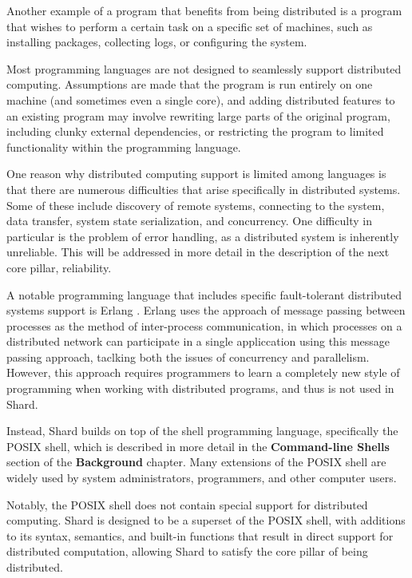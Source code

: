 \documentclass[twoside]{report}
\newcommand{\todoi}[1]{\todo[inline, color=blue!20]{TODO: {#1}}}
\begin{document}
Another example of a program that benefits from being distributed is a program that wishes to perform a certain task on a specific set of machines, such as installing packages, collecting logs, or configuring the system.

Most programming languages are not designed to seamlessly support distributed computing.
Assumptions are made that the program is run entirely on one machine (and sometimes even a single core), and adding distributed features to an existing program may involve rewriting large parts of the original program, including clunky external dependencies, or restricting the program to limited functionality within the programming language.

One reason why distributed computing support is limited among languages is that there are numerous difficulties that arise specifically in distributed systems. Some of these include discovery of remote systems, connecting to the system, data transfer, system state serialization, and concurrency.
One difficulty in particular is the problem of error handling, as a distributed system is inherently unreliable. This will be addressed in more detail in the description of the next core pillar, reliability.

A notable programming language that includes specific fault-tolerant distributed systems support is Erlang \cite{armstrong2010erlang}. Erlang uses the approach of message passing between processes as the method of inter-process communication, in which processes on a distributed network can participate in a single appliccation using this message passing approach, taclking both the issues of concurrency and parallelism.
However, this approach requires programmers to learn a completely new style of programming when working with distributed programs, and thus is not used in Shard.


Instead, Shard builds on top of the shell programming language, specifically the POSIX shell, which is described in more detail in the \textbf{Command-line Shells} section of the \textbf{Background} chapter. Many extensions of the POSIX shell are widely used by system administrators, programmers, and other computer users.

Notably, the POSIX shell does not contain special support for distributed computing. Shard is designed to be a superset of the POSIX shell, with additions to its syntax, semantics, and built-in functions that result in direct support for distributed computation, allowing Shard to satisfy the core pillar of being distributed.
\end{document}
